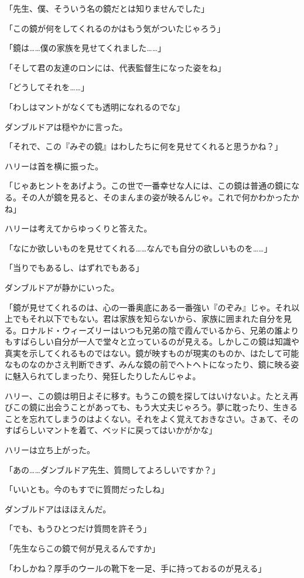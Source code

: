 \documentclass[10pt,a4paper]{article}
\begin{document}
\begin{CJK}{UTF8}{min}
「先生、僕、そういう名の鏡だとは知りませんでした」

「この鏡が何をしてくれるのかはもう気がついたじゃろう」

「鏡は……僕の家族を見せてくれました……」

「そして君の友達のロンには、代表監督生になった姿をね」

「どうしてそれを……」

「わしはマントがなくても透明になれるのでな」

ダンブルドアは穏やかに言った。

「それで、この『みぞの鏡』はわしたちに何を見せてくれると思うかね？」

ハリーは首を横に振った。

「じゃあヒントをあげよう。この世で一番幸せな人には、この鏡は普通の鏡になる。その人が鏡を見ると、そのまんまの姿が映るんじゃ。これで何かわかったかね」

ハリーは考えてからゆっくりと答えた。

「なにか欲しいものを見せてくれる……なんでも自分の欲しいものを……」

「当りでもあるし、はずれでもある」

ダンブルドアが静かにいった。

「鏡が見せてくれるのは、心の一番奥底にある一番強い『のぞみ』じゃ。それ以上でもそれ以下でもない。君は家族を知らないから、家族に囲まれた自分を見る。ロナルド・ウィーズリーはいつも兄弟の陰で霞んでいるから、兄弟の誰よりもすばらしい自分が一人で堂々と立っているのが見える。しかしこの鏡は知識や真実を示してくれるものではない。鏡が映すものが現実のものか、はたして可能なものなのかさえ判断できず、みんな鏡の前でへトヘトになったり、鏡に映る姿に魅入られてしまったり、発狂したりしたんじゃよ。

ハリー、この鏡は明日よそに移す。もうこの鏡を探してはいけないよ。たとえ再びこの鏡に出会うことがあっても、もう大丈夫じゃろう。夢に耽ったり、生きることを忘れてしまうのはよくない。それをよく覚えておきなさい。さぁて、そのすばらしいマントを着て、ベッドに戻ってはいかがかな」

ハリーは立ち上がった。

「あの……ダンブルドア先生、質問してよろしいですか？」

「いいとも。今のもすでに質問だったしね」

ダンブルドアはほほえんだ。

「でも、もうひとつだけ質問を許そう」

「先生ならこの鏡で何が見えるんですか」

「わしかね？厚手のウールの靴下を一足、手に持っておるのが見える」


\end{CJK}
\end{document}
